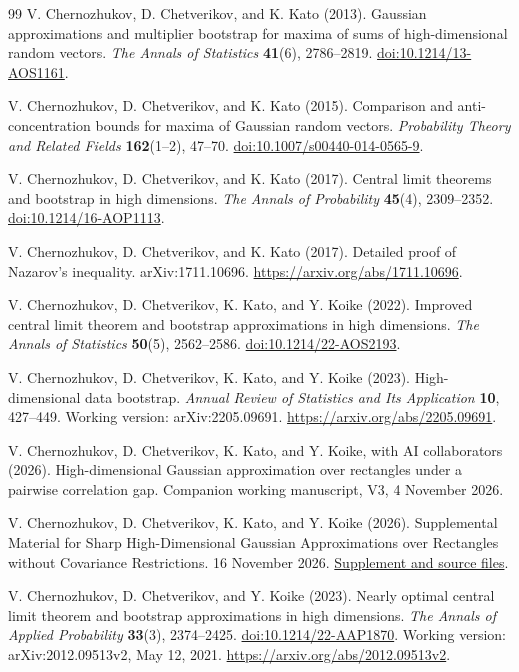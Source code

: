 \documentclass[11pt,letterpaper,twoside,leqno]{article}
\theoremstyle{bookplain}
\theoremstyle{bookremark}
\begin{document}
\begin{thebibliography}{99}
V. Chernozhukov, D. Chetverikov, and K. Kato (2013).
Gaussian approximations and multiplier bootstrap for maxima of
sums of high-dimensional random vectors.
\emph{The Annals of Statistics} \textbf{41}(6), 2786--2819.
\href{https://doi.org/10.1214/13-AOS1161}{doi:10.1214/13-AOS1161}.

{
V. Chernozhukov, D. Chetverikov, and K. Kato (2015).
Comparison and anti-concentration bounds for maxima of Gaussian
random vectors.
\emph{Probability Theory and Related Fields} \textbf{162}(1--2), 47--70.
\href{https://doi.org/10.1007/s00440-014-0565-9}{doi:10.1007/s00440-014-0565-9}.}

V. Chernozhukov, D. Chetverikov, and K. Kato (2017).
Central limit theorems and bootstrap in high dimensions.
\emph{The Annals of Probability} \textbf{45}(4), 2309--2352.
\href{https://doi.org/10.1214/16-AOP1113}{doi:10.1214/16-AOP1113}.

V. Chernozhukov, D. Chetverikov, and K. Kato (2017).
Detailed proof of Nazarov's inequality.
arXiv:1711.10696.
\url{https://arxiv.org/abs/1711.10696}.

V. Chernozhukov, D. Chetverikov, K. Kato, and Y. Koike (2022).
Improved central limit theorem and bootstrap approximations in
high dimensions. \emph{The Annals of Statistics} \textbf{50}(5), 2562--2586.
\href{https://doi.org/10.1214/22-AOS2193}{doi:10.1214/22-AOS2193}.

V. Chernozhukov, D. Chetverikov, K. Kato, and Y. Koike (2023).
High-dimensional data bootstrap.
\emph{Annual Review of Statistics and Its Application} \textbf{10}, 427--449.
Working version: arXiv:2205.09691.
\url{https://arxiv.org/abs/2205.09691}.

{
V. Chernozhukov, D. Chetverikov, K. Kato, and Y. Koike,
with AI collaborators (2026).
High-dimensional Gaussian approximation over rectangles under
a pairwise correlation gap. Companion working manuscript, V3,
4 November 2026.
}

V. Chernozhukov, D. Chetverikov, K. Kato, and Y. Koike (2026).
Supplemental Material for Sharp High-Dimensional Gaussian
Approximations over Rectangles without Covariance Restrictions.
16 November 2026.
\href{https://github.com/VC2015/rectangle-clt-singular/blob/main/research-rectangle-clt-singular/Rectangle_CLT_Supplement_2026-11-16.pdf}{Supplement and source files}.

V. Chernozhukov, D. Chetverikov, and Y. Koike (2023).
Nearly optimal central limit theorem and bootstrap approximations
in high dimensions.
\emph{The Annals of Applied Probability} \textbf{33}(3), 2374--2425.
\href{https://doi.org/10.1214/22-AAP1870}{doi:10.1214/22-AAP1870}.
Working version: arXiv:2012.09513v2, May 12, 2021.
\url{https://arxiv.org/abs/2012.09513v2}.


\end{thebibliography}
\end{document}

